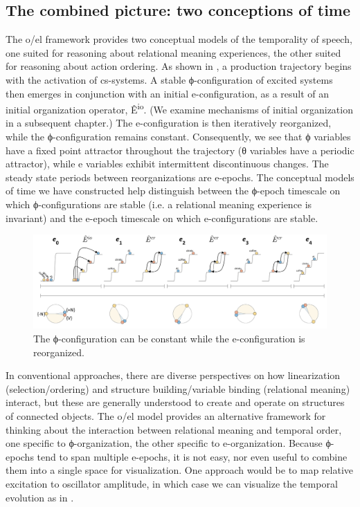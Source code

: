 \subsection{The combined picture: two conceptions of time}

The o/el framework provides two conceptual models of the temporality of speech, one suited for reasoning about relational meaning experiences, the other suited for reasoning about action ordering. As shown in {}, a production trajectory begins with the activation of cs-systems. A stable ϕ-configuration of excited systems then emerges in conjunction with an initial e-configuration, as a result of an initial organization operator, Ê\textsuperscript{io}. (We examine mechanisms of initial organization in a subsequent chapter.) The e-configuration is then iteratively reorganized, while the ϕ-configuration remains constant. Consequently, we see that ϕ variables have a fixed point attractor throughout the trajectory (θ variables have a periodic attractor), while e variables exhibit intermittent discontinuous changes. The steady state periods between reorganizations are e-epochs. The conceptual models of time we have constructed help distinguish between the ϕ-epoch timescale on which ϕ-configurations are stable (i.e. a relational meaning experience is invariant) and the e-epoch timescale on which e-configurations are stable.

  
\begin{figure}
\includegraphics[width=\textwidth]{figures/Tilsen-img27.png}
\caption{The ϕ-configuration can be constant while the e-configuration is reorganized.}
\label{fig:2:20}
\end{figure}
 

  In conventional approaches, there are diverse perspectives on how linearization (selection/ordering) and structure building/variable binding (relational meaning) interact, but these are generally understood to create and operate on structures of connected objects. The o/el model provides an alternative framework for thinking about the interaction between relational meaning and temporal order, one specific to ϕ-organization, the other specific to e-organization. Because ϕ-epochs tend to span multiple e-epochs, it is not easy, nor even useful to combine them into a single space for visualization. One approach would be to map relative excitation to oscillator amplitude, in which case we can visualize the temporal evolution as in {}.

